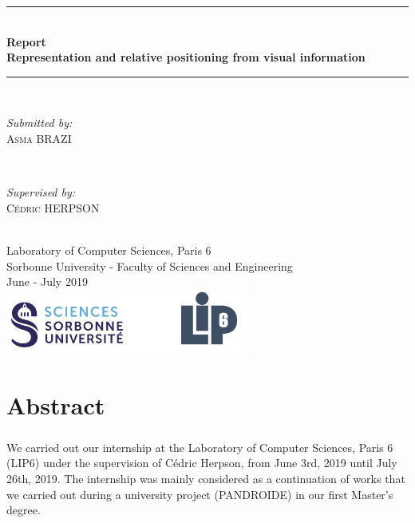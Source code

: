 \documentclass[12pt]{report}
\begin{document}
	\begin{titlepage}
		
		\newcommand{\HRule}{\rule{\linewidth}{0.5mm}} %
		
		\center 
		\HRule \\[0.4cm]
		{ \huge \bfseries Report \\Representation and relative positioning from visual information}\\[0.4cm]
		\HRule \\[1.5cm]
		
		\begin{minipage}{0.4\textwidth}
			\begin{flushleft} \large
				\emph{Submitted by:}\\
				\textsc{Asma BRAZI}
			\end{flushleft}
		\end{minipage}
		~
		\begin{minipage}{0.4\textwidth}
			\begin{flushright} \large
				\emph{Supervised by:} \\
				\textsc{Cédric HERPSON}\\
			\end{flushright}
		\end{minipage}\\[4cm]
		
		
		{\large Laboratory of Computer Sciences, Paris 6 \\ Sorbonne University - Faculty of Sciences and Engineering}\\[3cm] 
		{\large June - July 2019 }\\[3cm] 
		\includegraphics[width=0.6\textwidth]{res/logo.png}\\[1cm] 
		\vfill %
		
	\end{titlepage}
	

	\chapter{Abstract}
	
	\paragraph{}
	We carried out our internship at the Laboratory of Computer Sciences, Paris 6 (LIP6) under the supervision of Cédric Herpson, from June 3rd, 2019 until July 26th, 2019. The internship was mainly considered as a continuation of works that we carried out during a university project (PANDROIDE) in our first Master's degree. 
	
\end{document}
